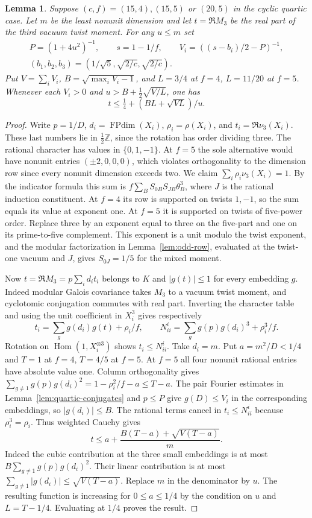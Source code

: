 \documentclass[11pt,a4paper]{article}
\newtheorem{lemma}[theorem]{Lemma}
\numberwithin{equation}{section}
\begin{document}
\begin{lemma}\label{lem:quartic-least-third}
Suppose $(c,f)=(15,4),(15,5)$ or $(20,5)$ in the cyclic quartic case. Let $m$ be the least nonunit dimension and let $t=\Re M_3$ be the real part of the third vacuum twist moment. For any $u\le m$ set
\[
 \begin{gathered}
 P=(1+4u^2)^{-1},\qquad s=1-1/f,\qquad
 V_i=\left((s-b_i)/2-P\right)^{-1},\\
 (b_1,b_2,b_3)=(1/\sqrt5,\sqrt{2/c},\sqrt{2/c}).
\end{gathered}
\]
Put $V=\sum_i V_i$, $B=\sqrt{\max_i V_i-1}$, and $L=3/4$ at $f=4$, $L=11/20$ at $f=5$. Whenever each $V_i>0$ and $u>B+\tfrac12\sqrt{V/L}$, one has
\[
 t\le \tfrac14+(BL+\sqrt{VL})/u.
\]
\end{lemma}
\begin{proof}
Write $p=1/D$, $d_i=\operatorname{FPdim}(X_i)$,
$\rho_i=\rho(X_i)$, and $t_i=\Re\nu_3(X_i)$. These last numbers lie
in $\frac12\mathbb Z$, since the rotation has order dividing three.
The rational character has values in $\{0,1,-1\}$. At $f=5$ the sole
alternative would have nonunit entries $(\pm2,0,0,0)$, which violates
orthogonality to the dimension row since every nonunit dimension exceeds two.
We claim $\sum_i\rho_i\nu_3(X_i)=1$. By the indicator formula this sum
is $f\sum_B S_{0B}S_{JB}\theta_B^3$, where $J$ is the rational
induction constituent. At $f=4$ its row is supported on twists $1,-1$,
so the sum equals its value at exponent one. At $f=5$ it is supported on
twists of five-power order. Replace three by an exponent equal to three
on the five-part and one on its prime-to-five complement. This exponent
is a unit modulo the twist exponent, and the modular factorization in
Lemma~\ref{lem:odd-row}, evaluated at the twist-one vacuum and $J$, gives
$S_{0J}=1/5$ for the mixed moment.

Now $t=\Re M_3=p\sum_i d_i t_i$ belongs to $K$ and $|g(t)|\le1$ for every
embedding $g$. Indeed modular Galois covariance takes $M_3$ to a vacuum
twist moment, and cyclotomic conjugation commutes with real part.
Inverting the character table and using the unit coefficient in $X_i^3$
gives respectively
\[
 t_i=\sum_g g(d_i)g(t)+\rho_i/f,\qquad
 N_{ii}^i=\sum_g g(p)g(d_i)^3+\rho_i^3/f .
\]
Rotation on $\operatorname{Hom}(1,X_i^{\otimes3})$ shows $t_i\le N_{ii}^i$.
Take $d_i=m$. Put $a=m^2/D<1/4$ and $T=1$ at $f=4$, $T=4/5$ at $f=5$. At $f=5$ all four nonunit rational entries have absolute value one. Column orthogonality gives $\sum_{g\ne1}g(p)g(d_i)^2=1-\rho_i^2/f-a\le T-a$. The pair Fourier estimates in Lemma~\ref{lem:quartic-conjugates} and $p\le P$ give $g(D)\le V_i$ in the corresponding embeddings, so $|g(d_i)|\le B$. The rational terms cancel in $t_i\le N_{ii}^i$ because $\rho_i^3=\rho_i$. Thus weighted Cauchy gives
\[
 t\le a+\frac{B(T-a)+\sqrt{V(T-a)}}{m}.
\]
Indeed the cubic contribution at the three small embeddings is at most $B\sum_{g\ne1}g(p)g(d_i)^2$. Their linear contribution is at most $\sum_{g\ne1}|g(d_i)|\le\sqrt{V(T-a)}$. Replace $m$ in the denominator by $u$. The resulting function is increasing for $0\le a\le1/4$ by the condition on $u$ and $L=T-1/4$. Evaluating at $1/4$ proves the result.
\end{proof}
\end{document}
